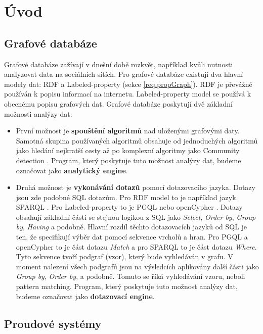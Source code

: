 \chapter*{Úvod}

\section*{Grafové databáze}

Grafové databáze zažívají v dnešní době rozkvět, například kvůli nutnosti analyzovat data na sociálních sítích.
Pro grafové databáze existují dva hlavní modely dat: RDF \citep{rdf} a Labeled-property (sekce \ref{req.propGraph}).
RDF je převážně používán k popisu informací na internetu. 
Labeled-property model se používá k obecnému popisu grafových dat.
Grafové databáze poskytují dvě základní možnosti analýzy dat:
\begin{itemize}
\item
První možnost je \textbf{spouštění algoritmů} nad uloženými grafovými daty.
Samotná skupina používaných algoritmů obsahuje od jednoduchých algoritmů jako hledání nejkratší cesty až po komplexní algoritmy jako Community detection \citep[str. 115]{graphAlg}.
Program, který poskytuje tuto možnost analýzy dat, budeme označovat jako \textbf{analytický engine}.
\item
Druhá možnost je \textbf{vykonávání dotazů} pomocí dotazovacího jazyka.
Dotazy jsou zde podobné SQL dotazům.
Pro RDF model to je například jazyk SPARQL \citep{sparql}.
Pro Labeled-property to je PGQL \citep{pgql} nebo openCypher \citep{openCypher}.
Dotazy obsahují základní části se stejnou logikou z SQL jako \textit{Select}, \textit{Order by}, \textit{Group by}, \textit{Having} a podobně.
Hlavní rozdíl těchto dotazovacích jazyků od SQL je ten, že specifikují výběr dat pomocí sekvence vrcholů a hran.
Pro PGQL a openCypher to je část dotazu \textit{Match} a pro SPARQL to je část dotazu \textit{Where}.
Tyto sekvence tvoří podgraf (vzor), který bude vyhledáván v grafu.
V moment nalezení všech podgrafů jsou na výsledcích aplikovány další části jako \textit{Group by}, \textit{Order by}, a podobně.
Tomuto se říká vyhledávání vzoru, neboli pattern matching.
Program, který poskytuje tuto možnost analýzy dat, budeme označovat jako \textbf{dotazovací engine}.
\end{itemize}

\section*{Proudové systémy}

